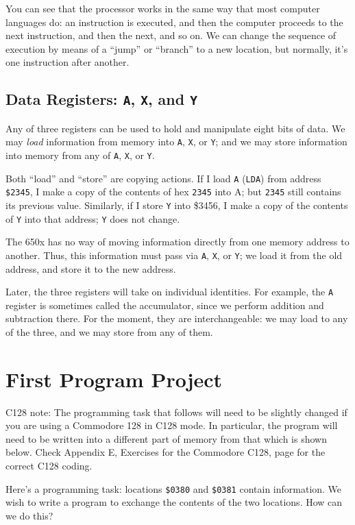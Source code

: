 \documentclass[11pt,a4paper,titlepage]{memoir}
\begin{document}
You can see that the processor works in the same way that most computer
languages do: an instruction is executed, and then the computer proceeds
to the next instruction, and then the next, and so on. We can change the
sequence of execution by means of a ``jump'' or ``branch'' to a new location,
but normally, it's one instruction after another.
\subsection{Data Registers: \texttt{A}, \texttt{X}, and \texttt{Y}}
Any of three registers can be used to hold and manipulate eight bits of
data. We may \emph{load} information from memory into \texttt{A}, \texttt{X}, or \texttt{Y}; and we may
store information into memory from any of \texttt{A}, \texttt{X}, or \texttt{Y}.

Both ``load'' and ``store'' are copying actions. If I load \texttt{A} (\texttt{LDA}) from
address \texttt{\$2345}, I make a copy of the contents of hex \texttt{2345} into A; but
\texttt{2345} still contains its previous value. Similarly, if I store \texttt{Y} into \$3456,
I make a copy of the contents of \texttt{Y} into that address; \texttt{Y} does not change.

The 650x has no way of moving information directly from one memory
address to another. Thus, this information must pass via \texttt{A}, \texttt{X}, or \texttt{Y}; we
load it from the old address, and store it to the new address.

Later, the three registers will take on individual identities. For example,
the \texttt{A} register is sometimes called the accumulator, since we perform
addition and subtraction there. For the moment, they are interchangeable:
we may load to any of the three, and we may store from any of them.
\section{First Program Project}
C128 note: The programming task that follows will need to be slightly
changed if you are using a Commodore 128 in C128 mode. In particular,
the program will need to be written into a different part of memory from
that which is shown below. Check Appendix E, Exercises for the Commodore C128, page \pageref{app:e_251} for the correct C128 coding.

Here's a programming task: locations \texttt{\$0380} and \texttt{\$0381} contain information. We wish to write a program to exchange the contents of the
two locations. How can we do this?
\end{document}
